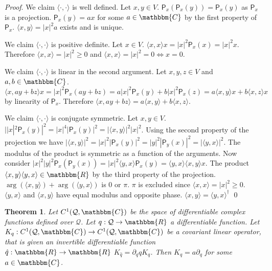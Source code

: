 \documentclass[aps,pra,10pt,twocolumn,floatfix,nofootinbib]{revtex4-1}
\numberwithin{equation}{section}
\newtheorem{thrm}[equation]{Theorem}
\theoremstyle{definition}
\renewenvironment{proof}{\emph{Proof}.}{\qed}
\begin{document}
\begin{proof}
	We claim $\langle \cdot , \cdot \rangle$ is well defined. Let $x, y \in V$. $\mathsf{P}_x (\mathsf{P}_x (y)) =\mathsf{P}_x(y)$ as $\mathsf{P}_x$ is a projection. $\mathsf{P}_x(y) = a x $ for some $a \in \mathbbm{C}$ by the first property of $\mathsf{P}_x$. $\langle x , y \rangle = |x|^2 a$ exists and is unique. 
	
	We claim $\langle \cdot , \cdot \rangle$ is positive definite. Let $x \in V$. $\langle x , x \rangle x = |x|^2 \mathsf{P}_x(x) = |x|^2 x $. Therefore $\langle x , x \rangle = |x|^2 \ge 0$ and $\langle x , x \rangle = |x|^2 = 0 \Leftrightarrow x = 0$.
	
	We claim $\langle \cdot , \cdot \rangle$ is linear in the second argument. Let $x,y,z \in V$ and $a,b \in \mathbbm{C}$. $\langle x , a y + b z \rangle x = |x|^2 \mathsf{P}_x(a y + b z)=a  |x|^2 \mathsf{P}_x(y) + b  |x|^2 \mathsf{P}_x(z) = a \langle x , y \rangle x + b \langle x, z \rangle x$ by linearity of $\mathsf{P}_x$. Therefore $\langle x , a y + b z \rangle = a \langle x , y \rangle + b \langle x, z \rangle$.
	
	We claim $\langle \cdot , \cdot \rangle$ is conjugate symmetric. Let $x,y \in V$. $ | |x|^2\mathsf{P}_x(y)|^2 = |x|^4|\mathsf{P}_x(y)|^2 = |\langle x , y \rangle|^2 |x|^2$. Using the second property of the projection we have $|\langle x , y \rangle|^2 = |x|^2|\mathsf{P}_x(y)|^2 =  |y|^2|\mathsf{P}_y(x)|^2 = |\langle y , x \rangle|^2$. The modulus of the product is symmetric as a function of the arguments. Now consider $|x|^2|y|^2\mathsf{P}_x(\mathsf{P}_y(x)) = |x|^2 \langle y , x \rangle \mathsf{P}_x(y) = \langle y , x \rangle \langle x , y \rangle x$. The product $\langle x , y \rangle \langle y , x \rangle \in \mathbbm{R}$ by the third property of the projection. $\arg(\langle x , y \rangle) + \arg(\langle y , x \rangle)$ is $0$ or $\pi$. $\pi$ is excluded since $\langle x , x \rangle = |x|^2 \ge 0$. $\langle y , x \rangle$ and $\langle x , y \rangle$ have equal modulus and opposite phase. $\langle x , y \rangle = \langle y , x \rangle^\dagger$
\end{proof}

\begin{thrm}\label{thrm:covariant_operator}
	Let $C^1(\mathcal{Q}, \mathbbm{C})$ be the space of differentiable complex functions defined over $\mathcal{Q}$. Let $q : \mathcal{Q} \rightarrow \mathbbm{R}$ a differentiable function. Let $K_q : C^1(\mathcal{Q}, \mathbbm{C}) \rightarrow C^1(\mathcal{Q}, \mathbbm{C})$ be a covariant linear operator, that is given an invertible differentiable function $\hat{q} : \mathbbm{R} \rightarrow \mathbbm{R}$ $K_{\hat{q}} = \partial_{\hat{q}} q K_{q}$. Then $K_q = a \partial_q$ for some $a \in \mathbbm{C}$.
\end{thrm}
\end{document}

